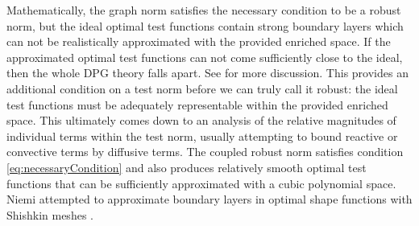 \documentclass{article}
\theoremstyle{definition}
\theoremstyle{remark}
\begin{document}
Mathematically, the graph norm satisfies the necessary condition to be a robust norm, but the ideal optimal test functions contain strong boundary
layers which can not be realistically approximated with the provided enriched space.
If the approximated optimal test functions can not come sufficiently close to the ideal, then the whole DPG theory falls apart.
See \cite{PracticalDPG} for more discussion.
This provides an additional condition on a test norm before we can truly call it robust: the ideal test functions must be adequately representable within 
the provided enriched space.
This ultimately comes down to an analysis of the relative magnitudes of individual terms within the test norm, usually attempting to bound reactive or convective terms by diffusive terms.
The coupled robust norm satisfies condition \eqref{eq:necessaryCondition} and also produces relatively smooth optimal test functions that can be sufficiently approximated
with a cubic polynomial space.
Niemi \etal attempted to approximate boundary layers in optimal shape functions with Shishkin meshes \cite{NiemiShishkin,niemi2013discontinuous}.
\end{document}
